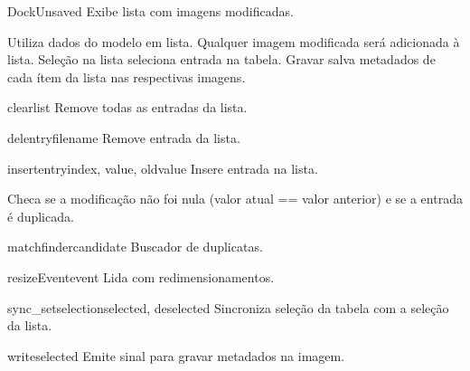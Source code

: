\documentclass[letterpaper,10pt,portuguese]{manual}
\begin{document}
\hypertarget{veliger.DockUnsaved}{}\begin{classdesc}{DockUnsaved}{}
Exibe lista com imagens modificadas.

Utiliza dados do modelo em lista. Qualquer imagem modificada será
adicionada à lista. Seleção na lista seleciona entrada na tabela. Gravar
salva metadados de cada ítem da lista nas respectivas imagens.

\hypertarget{veliger.DockUnsaved.clearlist}{}\begin{methoddesc}{clearlist}{}
Remove todas as entradas da lista.
\end{methoddesc}

\hypertarget{veliger.DockUnsaved.delentry}{}\begin{methoddesc}{delentry}{filename}
Remove entrada da lista.
\end{methoddesc}

\hypertarget{veliger.DockUnsaved.insertentry}{}\begin{methoddesc}{insertentry}{index, value, oldvalue}
Insere entrada na lista.

Checa se a modificação não foi nula (valor atual == valor anterior) e
se a entrada é duplicada.
\end{methoddesc}

\hypertarget{veliger.DockUnsaved.matchfinder}{}\begin{methoddesc}{matchfinder}{candidate}
Buscador de duplicatas.
\end{methoddesc}

\hypertarget{veliger.DockUnsaved.resizeEvent}{}\begin{methoddesc}{resizeEvent}{event}
Lida com redimensionamentos.
\end{methoddesc}

\hypertarget{veliger.DockUnsaved.sync\_setselection}{}\begin{methoddesc}{sync\_setselection}{selected, deselected}
Sincroniza seleção da tabela com a seleção da lista.
\end{methoddesc}

\hypertarget{veliger.DockUnsaved.writeselected}{}\begin{methoddesc}{writeselected}{}
Emite sinal para gravar metadados na imagem.
\end{methoddesc}
\end{classdesc}
\end{document}
